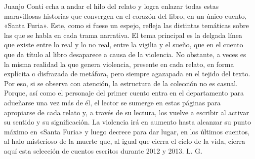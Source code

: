 \documentclass[12pt,twoside,openright,a5paper]{book}
\begin{document}
Juanjo Conti 
echa a andar el hilo del relato y logra enlazar todas estas maravillosas historias que convergen en el corazón del libro, en un único cuento, 
«Santa Furia». Este, como si fuese un espejo, refleja las distintas temáticas sobre las que se habla en cada trama narrativa. El tema principal es la delgada línea que existe entre lo real y lo no real, entre la vigilia y el sueño, que en 
el cuento que da título al libro
desaparece a causa de la violencia. No obstante, a veces es la misma realidad la que genera violencia, 
presente en cada relato, en forma explícita o disfrazada de metáfora, pero siempre agazapada en el tejido del texto. Por eso, si se observa con atención, la estructura de la colección no es casual. Porque, así como el personaje del primer cuento entra en el departamento para adueñarse una vez más de él, el lector se sumerge en estas páginas para apropiarse de cada relato y, a través de su lectura, los vuelve a escribir al activar su sentido y su significación. La violencia irá en aumento hasta alcanzar su punto máximo en «Santa Furia» y luego decrece para dar lugar, en los últimos cuentos, al halo misterioso de la muerte que, al igual que cierra el ciclo de la vida, cierra aquí %
esta selección de cuentos escritos durante 2012 y 2013. L. G.



 
 
 
 
 
 
 
 
 
 
 
 
 
 


\end{document}
